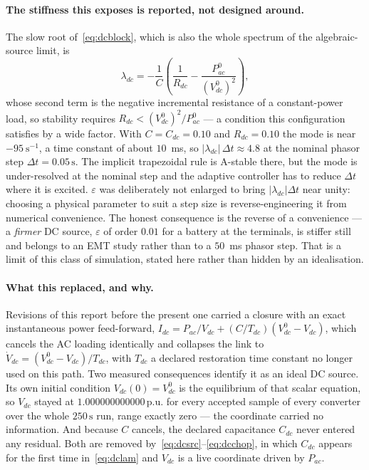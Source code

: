\documentclass[12pt,a4paper]{article}
\theoremstyle{remark}
\newcommand{\pu}{\,\mathrm{p.u.}}
\newcommand{\second}{\,\mathrm{s}}
\begin{document}
\paragraph{The stiffness this exposes is reported, not designed around.}
The slow root of~\eqref{eq:dcblock}, which is also the whole spectrum of the
algebraic-source limit, is
\begin{equation}
  \lambda_{dc}=-\frac{1}{C}\left(\frac{1}{R_{dc}}-\frac{P_{ac}^{0}}{(V_{dc}^{0})^{2}}\right),
  \label{eq:dclam}
\end{equation}
whose second term is the negative incremental resistance of a constant-power
load, so stability requires $R_{dc}<(V_{dc}^{0})^{2}/P_{ac}^{0}$ --- a condition
this configuration satisfies by a wide factor. With $C=C_{dc}=0.10$ and
$R_{dc}=0.10$ the mode is near $-95\ \mathrm{s^{-1}}$, a time constant of about
$10$~ms, so $|\lambda_{dc}|\,\Delta t\approx4.8$ at the nominal phasor step
$\Delta t=0.05\second$. The implicit trapezoidal rule is A-stable there, but the
mode is under-resolved at the nominal step and the adaptive controller has to
reduce $\Delta t$ where it is excited. $\varepsilon$ was deliberately not
enlarged to bring $|\lambda_{dc}|\Delta t$ near unity: choosing a physical
parameter to suit a step size is reverse-engineering it from numerical
convenience. The honest consequence is the reverse of a convenience --- a
\emph{firmer} DC source, $\varepsilon$ of order $0.01$ for a battery at the
terminals, is stiffer still and belongs to an EMT study rather than to a
$50$~ms phasor step. That is a limit of this class of simulation, stated here
rather than hidden by an idealisation.

\paragraph{What this replaced, and why.} Revisions of this report before the
present one carried a closure with an exact instantaneous power feed-forward,
$I_{dc}=P_{ac}/V_{dc}+(C/T_{dc})(V_{dc}^{0}-V_{dc})$, which cancels the AC
loading identically and collapses the link to
$\dot V_{dc}=(V_{dc}^{0}-V_{dc})/T_{dc}$, with $T_{dc}$ a declared restoration time
constant no longer used on this path. Two measured consequences identify it
as an ideal DC source. Its own initial condition $V_{dc}(0)=V_{dc}^{0}$ is the
equilibrium of that scalar equation, so $V_{dc}$ stayed at $1.000000000000\pu$
for every accepted sample of every converter over the whole $250\second$ run,
range exactly zero --- the coordinate carried no information. And because $C$
cancels, the declared capacitance $C_{dc}$ never entered any residual. Both are
removed by~\eqref{eq:dcsrc}--\eqref{eq:dcchop}, in which $C_{dc}$ appears for the
first time in~\eqref{eq:dclam} and $V_{dc}$ is a live coordinate driven by
$P_{ac}$.
\end{document}
